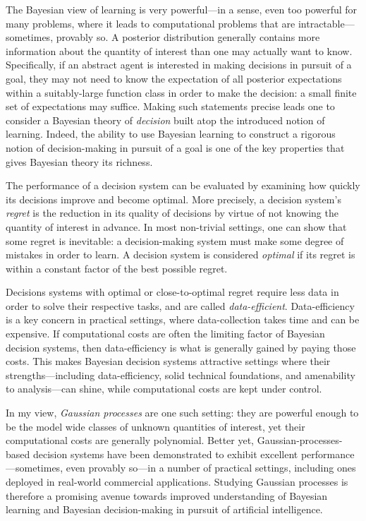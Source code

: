 \documentclass[11pt]{book}
\begin{document}
The Bayesian view of learning is very powerful---in a sense, even too powerful for many problems, where it leads to computational problems that are intractable---sometimes, provably so.
A posterior distribution generally contains more information about the quantity of interest than one may actually want to know.
Specifically, if an abstract agent is interested in making decisions in pursuit of a goal, they may not need to know the expectation of all posterior expectations within a suitably-large function class in order to make the decision: a small finite set of expectations may suffice.
Making such statements precise leads one to consider a Bayesian theory of \emph{decision} built atop the introduced notion of learning.
Indeed, the ability to use Bayesian learning to construct a rigorous notion of decision-making in pursuit of a goal is one of the key properties that gives Bayesian theory its richness.

The performance of a decision system can be evaluated by examining how quickly its decisions improve and become optimal.
More precisely, a decision system's \emph{regret} is the reduction in its quality of decisions by virtue of not knowing the quantity of interest in advance.
In most non-trivial settings, one can show that some regret is inevitable: a decision-making system must make some degree of mistakes in order to learn.
A decision system is considered \emph{optimal} if its regret is within a constant factor of the best possible regret.

Decisions systems with optimal or close-to-optimal regret require less data in order to solve their respective tasks, and are called \emph{data-efficient}.
Data-efficiency is a key concern in practical settings, where data-collection takes time and can be expensive.
If computational costs are often the limiting factor of Bayesian decision systems, then data-efficiency is what is generally gained by paying those costs.
This makes Bayesian decision systems attractive settings where their strengths---including data-efficiency, solid technical foundations, and amenability to analysis---can shine, while computational costs are kept under control.

In my view, \emph{Gaussian processes} are one such setting: they are powerful enough to be the model wide classes of unknown quantities of interest, yet their computational costs are generally polynomial.
Better yet, Gaussian-processes-based decision systems have been demonstrated to exhibit excellent performance---sometimes, even provably so---in a number of practical settings, including ones deployed in real-world commercial applications.
Studying Gaussian processes is therefore a promising avenue towards improved understanding of Bayesian learning and Bayesian decision-making in pursuit of artificial intelligence.
\end{document}
